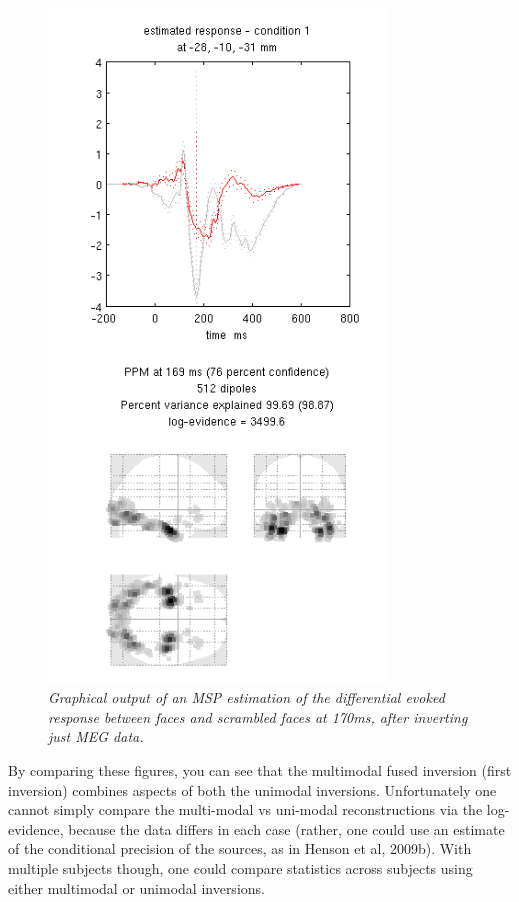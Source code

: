 \begin{figure}
\begin{center}
\includegraphics[width=90mm]{multimodal/figures/fused_meg_msp.png}
\caption{\em Graphical output of an MSP estimation of the differential evoked response between faces and scrambled faces at 170ms, after inverting just MEG data. \label{multimodal:fusion:fig:3}}
\end{center}
\end{figure}

By comparing these figures, you can see that the multimodal fused inversion (first inversion) combines aspects of both the unimodal inversions. Unfortunately one cannot simply compare the multi-modal vs uni-modal reconstructions via the log-evidence, because the data differs in each case (rather, one could use an estimate of the conditional precision of the sources, as in Henson et al, 2009b). With multiple subjects though, one could compare statistics across subjects using either multimodal or unimodal inversions.

